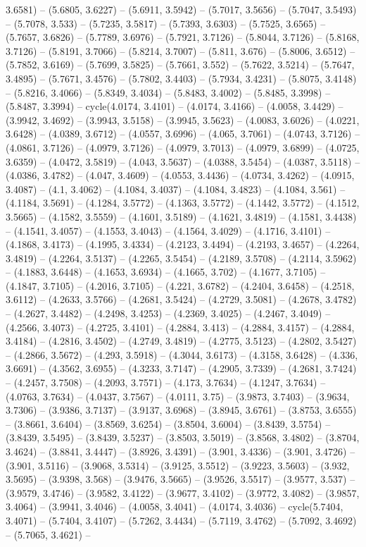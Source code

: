 3.6581) -- (5.6805, 3.6227) -- (5.6911, 3.5942) -- (5.7017, 3.5656) -- (5.7047, 3.5493) -- (5.7078, 3.533) -- (5.7235, 3.5817) -- (5.7393, 3.6303) -- (5.7525, 3.6565) -- (5.7657, 3.6826) -- (5.7789, 3.6976) -- (5.7921, 3.7126) -- (5.8044, 3.7126) -- (5.8168, 3.7126) -- (5.8191, 3.7066) -- (5.8214, 3.7007) -- (5.811, 3.676) -- (5.8006, 3.6512) -- (5.7852, 3.6169) -- (5.7699, 3.5825) -- (5.7661, 3.552) -- (5.7622, 3.5214) -- (5.7647, 3.4895) -- (5.7671, 3.4576) -- (5.7802, 3.4403) -- (5.7934, 3.4231) -- (5.8075, 3.4148) -- (5.8216, 3.4066) -- (5.8349, 3.4034) -- (5.8483, 3.4002) -- (5.8485, 3.3998) -- (5.8487, 3.3994) -- cycle(4.0174, 3.4101) -- (4.0174, 3.4166) -- (4.0058, 3.4429) -- (3.9942, 3.4692) -- (3.9943, 3.5158) -- (3.9945, 3.5623) -- (4.0083, 3.6026) -- (4.0221, 3.6428) -- (4.0389, 3.6712) -- (4.0557, 3.6996) -- (4.065, 3.7061) -- (4.0743, 3.7126) -- (4.0861, 3.7126) -- (4.0979, 3.7126) -- (4.0979, 3.7013) -- (4.0979, 3.6899) -- (4.0725, 3.6359) -- (4.0472, 3.5819) -- (4.043, 3.5637) -- (4.0388, 3.5454) -- (4.0387, 3.5118) -- (4.0386, 3.4782) -- (4.047, 3.4609) -- (4.0553, 3.4436) -- (4.0734, 3.4262) -- (4.0915, 3.4087) -- (4.1, 3.4062) -- (4.1084, 3.4037) -- (4.1084, 3.4823) -- (4.1084, 3.561) -- (4.1184, 3.5691) -- (4.1284, 3.5772) -- (4.1363, 3.5772) -- (4.1442, 3.5772) -- (4.1512, 3.5665) -- (4.1582, 3.5559) -- (4.1601, 3.5189) -- (4.1621, 3.4819) -- (4.1581, 3.4438) -- (4.1541, 3.4057) -- (4.1553, 3.4043) -- (4.1564, 3.4029) -- (4.1716, 3.4101) -- (4.1868, 3.4173) -- (4.1995, 3.4334) -- (4.2123, 3.4494) -- (4.2193, 3.4657) -- (4.2264, 3.4819) -- (4.2264, 3.5137) -- (4.2265, 3.5454) -- (4.2189, 3.5708) -- (4.2114, 3.5962) -- (4.1883, 3.6448) -- (4.1653, 3.6934) -- (4.1665, 3.702) -- (4.1677, 3.7105) -- (4.1847, 3.7105) -- (4.2016, 3.7105) -- (4.221, 3.6782) -- (4.2404, 3.6458) -- (4.2518, 3.6112) -- (4.2633, 3.5766) -- (4.2681, 3.5424) -- (4.2729, 3.5081) -- (4.2678, 3.4782) -- (4.2627, 3.4482) -- (4.2498, 3.4253) -- (4.2369, 3.4025) -- (4.2467, 3.4049) -- (4.2566, 3.4073) -- (4.2725, 3.4101) -- (4.2884, 3.413) -- (4.2884, 3.4157) -- (4.2884, 3.4184) -- (4.2816, 3.4502) -- (4.2749, 3.4819) -- (4.2775, 3.5123) -- (4.2802, 3.5427) -- (4.2866, 3.5672) -- (4.293, 3.5918) -- (4.3044, 3.6173) -- (4.3158, 3.6428) -- (4.336, 3.6691) -- (4.3562, 3.6955) -- (4.3233, 3.7147) -- (4.2905, 3.7339) -- (4.2681, 3.7424) -- (4.2457, 3.7508) -- (4.2093, 3.7571) -- (4.173, 3.7634) -- (4.1247, 3.7634) -- (4.0763, 3.7634) -- (4.0437, 3.7567) -- (4.0111, 3.75) -- (3.9873, 3.7403) -- (3.9634, 3.7306) -- (3.9386, 3.7137) -- (3.9137, 3.6968) -- (3.8945, 3.6761) -- (3.8753, 3.6555) -- (3.8661, 3.6404) -- (3.8569, 3.6254) -- (3.8504, 3.6004) -- (3.8439, 3.5754) -- (3.8439, 3.5495) -- (3.8439, 3.5237) -- (3.8503, 3.5019) -- (3.8568, 3.4802) -- (3.8704, 3.4624) -- (3.8841, 3.4447) -- (3.8926, 3.4391) -- (3.901, 3.4336) -- (3.901, 3.4726) -- (3.901, 3.5116) -- (3.9068, 3.5314) -- (3.9125, 3.5512) -- (3.9223, 3.5603) -- (3.932, 3.5695) -- (3.9398, 3.568) -- (3.9476, 3.5665) -- (3.9526, 3.5517) -- (3.9577, 3.537) -- (3.9579, 3.4746) -- (3.9582, 3.4122) -- (3.9677, 3.4102) -- (3.9772, 3.4082) -- (3.9857, 3.4064) -- (3.9941, 3.4046) -- (4.0058, 3.4041) -- (4.0174, 3.4036) -- cycle(5.7404, 3.4071) -- (5.7404, 3.4107) -- (5.7262, 3.4434) -- (5.7119, 3.4762) -- (5.7092, 3.4692) -- (5.7065, 3.4621) -- 